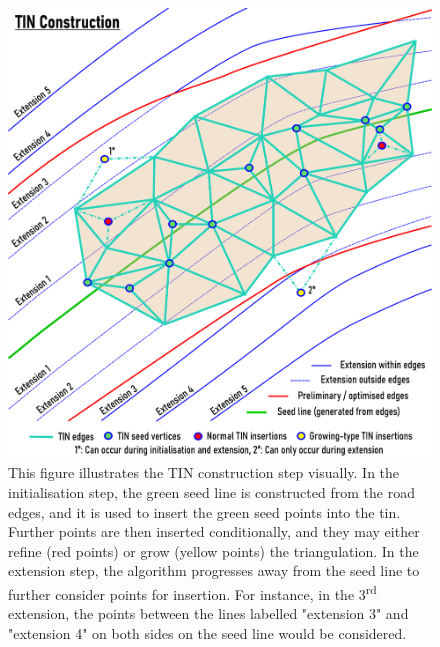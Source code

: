 \begin{figure}
    \centering
    \includegraphics[width=\linewidth]{final_report/figs/tin_construction_illu.pdf}
    \caption[Illustration of the TIN construction step]{This figure illustrates the TIN construction step visually. In the initialisation step, the green seed line is constructed from the road edges, and it is used to insert the green seed points into the \ac{tin}. Further points are then inserted conditionally, and they may either refine (red points) or grow (yellow points) the triangulation. In the extension step, the algorithm progresses away from the seed line to further consider points for insertion. For instance, in the 3\textsuperscript{rd} extension, the points between the lines labelled "extension 3" and "extension 4" on both sides on the seed line would be considered.}
    \label{fig:tinconstruction_illu}
\end{figure}

